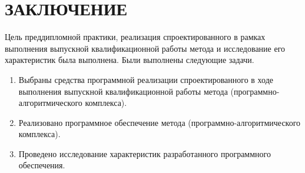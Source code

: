 \chapter*{ЗАКЛЮЧЕНИЕ}

Цель преддипломной практики, реализация спроектированного в рамках выполнения выпускной квалификационной работы метода и исследование его характеристик была выполнена. Были выполнены следующие задачи.

\begin{enumerate}
	\item Выбраны средства программной реализации спроектированного в ходе выполнения выпускной квалификационной работы метода (программно-алгоритмического комплекса).
	\item Реализовано программное обеспечение метода (программно-алгоритмического комплекса).
	\item Проведено исследование характеристик разработанного программного обеспечения.
\end{enumerate}